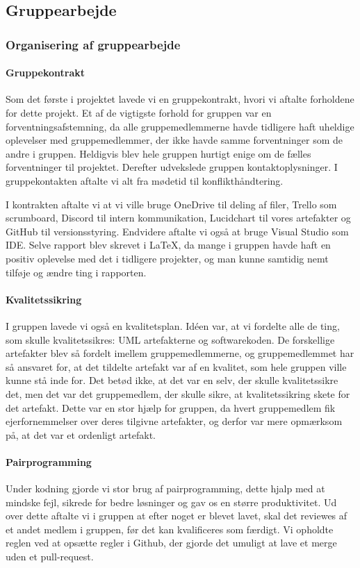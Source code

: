 \subsection{Gruppearbejde}
\subsubsection{Organisering af gruppearbejde}

\paragraph*{Gruppekontrakt}
Som det første i projektet lavede vi en gruppekontrakt, 
hvori vi aftalte forholdene for dette projekt.
Et af de vigtigste forhold for gruppen var en forventningsafstemning, da alle gruppemedlemmerne havde tidligere haft uheldige oplevelser med gruppemedlemmer, der ikke havde samme forventninger som de andre i gruppen.
Heldigvis blev hele gruppen hurtigt enige om de fælles forventninger til projektet.
Derefter udvekslede gruppen kontaktoplysninger.
I gruppekontakten aftalte vi alt fra mødetid til konflikthåndtering.


I kontrakten aftalte vi at vi ville bruge OneDrive til deling af filer, Trello som scrumboard, Discord til intern kommunikation, Lucidchart til vores artefakter og GitHub til versionsstyring. 
Endvidere aftalte vi også at bruge Visual Studio som IDE.
Selve rapport blev skrevet i \LaTeX, da mange i gruppen havde haft en positiv oplevelse med det i tidligere projekter, og man kunne samtidig nemt tilføje og ændre ting i rapporten.

\paragraph*{Kvalitetssikring}
I gruppen lavede vi også en kvalitetsplan.
Idéen var, at vi fordelte alle de ting, som skulle kvalitetssikres: UML artefakterne og softwarekoden.
De forskellige artefakter blev så fordelt imellem gruppemedlemmerne, og gruppemedlemmet har så ansvaret for, at det tildelte artefakt var af en kvalitet, som hele gruppen ville kunne stå inde for.
Det betød ikke, at det var en selv, der skulle kvalitetssikre det, men det var det gruppemedlem, der skulle sikre, at kvalitetssikring skete for det artefakt.
Dette var en stor hjælp for gruppen, da hvert gruppemedlem fik ejerfornemmelser over deres tilgivne artefakter, og derfor var mere opmærksom på, at det var et ordenligt artefakt.

\paragraph*{Pairprogramming}
Under kodning gjorde vi stor brug af pairprogramming, dette hjalp med at mindske fejl, sikrede for bedre løsninger og gav os en større produktivitet.
Ud over dette aftalte vi i gruppen at efter noget er blevet lavet, 
skal det reviewes af et andet medlem i gruppen, før det kan kvalificeres som færdigt. Vi opholdte reglen ved at opsætte regler i Github, der gjorde det umuligt at lave et merge uden et pull-request.

